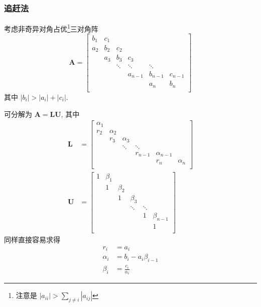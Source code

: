 \documentclass{ctexart}
\begin{document}
\subsubsection{追赶法}
    考虑非奇异对角占优\footnote{注意是 $|a_{ii}| > \sum_{j \neq i} |a_{ij}|$}三对角阵 \[
        \mathbf{A} = \begin{bmatrix}
            b_1 & c_1 &        &         &         &         \\
            a_2 & b_2 & c_2    &         &         &         \\
                & a_3 & b_3    & c_3     &         &         \\
                &     & \ddots & \ddots  & \ddots  &         \\
                &     &        & a_{n-1} & b_{n-1} & c_{n-1} \\
                &     &        &         & a_n     & b_n     \\
        \end{bmatrix}\]
    其中 $|b_i| > |a_i| + |c_i|$.\par
    可分解为 $\mathbf{A} = \mathbf{L} \mathbf{U}$, 其中 \begin{align*}
        \mathbf{L} &= \begin{bmatrix}
            \alpha_1 &          &          &         &              &          \\
            r_2      & \alpha_2 &          &         &              &          \\
                     & r_3      & \alpha_3 &         &              &          \\
                     &          & \ddots   & \ddots  &              &          \\
                     &          &          & r_{n-1} & \alpha_{n-1} &          \\
                     &          &          &         & r_n          & \alpha_n \\
        \end{bmatrix}\\
        \mathbf{U} &= \begin{bmatrix}
            1 & \beta_1 &         &         &         &             \\
              & 1       & \beta_2 &         &         &             \\
              &         & 1       & \beta_3 &         &             \\
              &         &         & \ddots  & \ddots  &             \\
              &         &         &         & 1       & \beta_{n-1} \\
              &         &         &         &         & 1           \\
        \end{bmatrix}\end{align*}
    同样直接容易求得 \begin{align*}
        r_i &= a_i\\
        \alpha_i &= b_i - a_i \beta_{i-1}\\
        \beta_i &= \frac{c_i}{\alpha_i}
    \end{align*}
\end{document}
